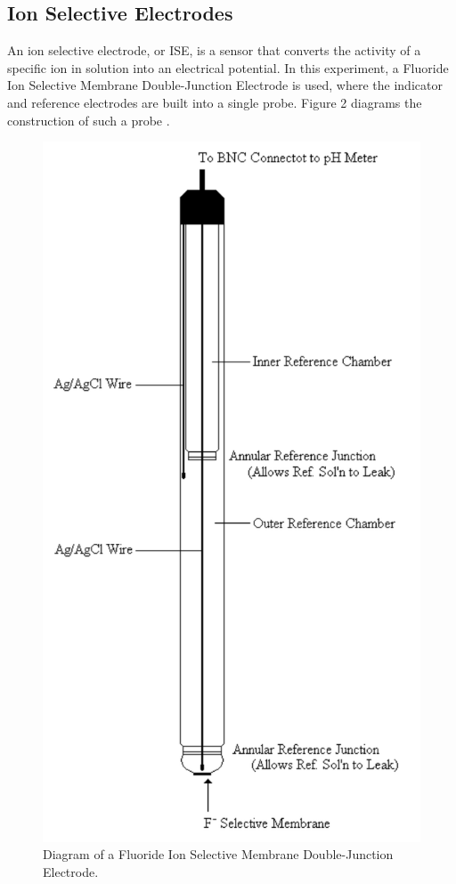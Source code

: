\documentclass[journal=jacsat,manuscript=article,layout=twocolumn]{achemso}
\begin{document}
\subsection {Ion Selective Electrodes}
An ion selective electrode, or ISE, is a sensor that converts the activity of a specific ion in solution into
an electrical potential.
In this experiment, a Fluoride Ion Selective Membrane Double-Junction Electrode
is used, where the indicator and reference electrodes are built into a single
probe. Figure 2 diagrams the construction of such a probe \cite{nmt}.
\begin{figure}
    \includegraphics[scale=0.4]{probe}
    \caption{Diagram of a Fluoride Ion Selective Membrane
    Double-Junction Electrode.}
\end{figure}
\end{document}

